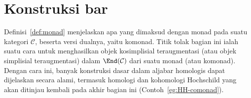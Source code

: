 
\section{Konstruksi bar}\label{sec:bar-resolution}
\hypertarget{o014.aljabr2.chapter8.bar-construction-a}{ }
Definisi~\ref{def:monad} menjelaskan apa yang dimaksud dengan monad pada
suatu kategori $\mathcal{C}$, beserta versi dualnya, yaitu komonad. Titik
tolak bagian ini ialah suatu cara untuk menghasilkan objek kosimplisial
teraugmentasi (atau objek simplisial teraugmentasi) dalam
$\End(\mathcal{C})$ dari suatu monad (atau komonad). Dengan cara ini,
banyak konstruksi dasar dalam aljabar homologis dapat dijelaskan secara
alami, termasuk homologi dan kohomologi Hochschild yang akan ditinjau
kembali pada akhir bagian ini (Contoh~\ref{eg:HH-comonad}).

